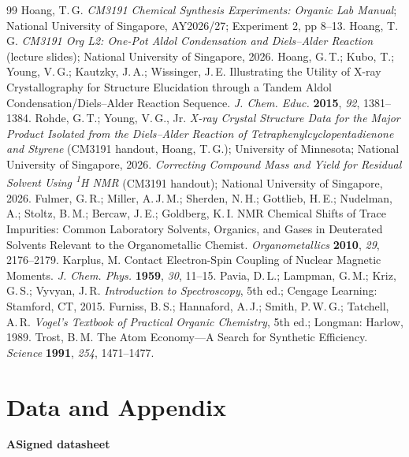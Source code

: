 \documentclass[11pt,a4paper]{article}
\begin{document}
\begin{thebibliography}{99}
\small
\setlength{\itemsep}{0pt}
 Hoang, T.\,G. \emph{CM3191 Chemical Synthesis Experiments: Organic Lab Manual}; National University of Singapore, AY2026/27; Experiment 2, pp 8--13.
 Hoang, T.\,G. \emph{CM3191 Org L2: One-Pot Aldol Condensation and Diels--Alder Reaction} (lecture slides); National University of Singapore, 2026.
 Hoang, G.\,T.; Kubo, T.; Young, V.\,G.; Kautzky, J.\,A.; Wissinger, J.\,E. Illustrating the Utility of X-ray Crystallography for Structure Elucidation through a Tandem Aldol Condensation/Diels--Alder Reaction Sequence. \emph{J. Chem. Educ.} \textbf{2015}, \emph{92}, 1381--1384.
 Rohde, G.\,T.; Young, V.\,G., Jr. \emph{X-ray Crystal Structure Data for the Major Product Isolated from the Diels--Alder Reaction of Tetraphenylcyclopentadienone and Styrene} (CM3191 handout, Hoang, T.\,G.); University of Minnesota; National University of Singapore, 2026.
 \emph{Correcting Compound Mass and Yield for Residual Solvent Using \textsuperscript{1}H NMR} (CM3191 handout); National University of Singapore, 2026.
 Fulmer, G.\,R.; Miller, A.\,J.\,M.; Sherden, N.\,H.; Gottlieb, H.\,E.; Nudelman, A.; Stoltz, B.\,M.; Bercaw, J.\,E.; Goldberg, K.\,I. NMR Chemical Shifts of Trace Impurities: Common Laboratory Solvents, Organics, and Gases in Deuterated Solvents Relevant to the Organometallic Chemist. \emph{Organometallics} \textbf{2010}, \emph{29}, 2176--2179.
 Karplus, M. Contact Electron-Spin Coupling of Nuclear Magnetic Moments. \emph{J. Chem. Phys.} \textbf{1959}, \emph{30}, 11--15.
 Pavia, D.\,L.; Lampman, G.\,M.; Kriz, G.\,S.; Vyvyan, J.\,R. \emph{Introduction to Spectroscopy}, 5th ed.; Cengage Learning: Stamford, CT, 2015.
 Furniss, B.\,S.; Hannaford, A.\,J.; Smith, P.\,W.\,G.; Tatchell, A.\,R. \emph{Vogel's Textbook of Practical Organic Chemistry}, 5th ed.; Longman: Harlow, 1989.
 Trost, B.\,M. The Atom Economy---A Search for Synthetic Efficiency. \emph{Science} \textbf{1991}, \emph{254}, 1471--1477.
\end{thebibliography}

\clearpage
\section*{Data and Appendix}

\textbf{A\quad Signed datasheet}
\end{document}
